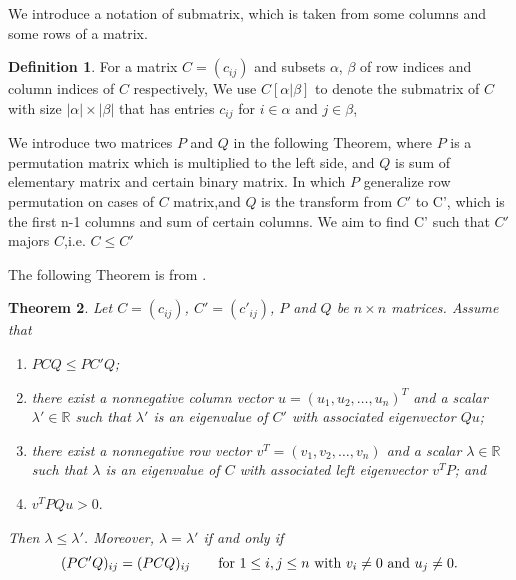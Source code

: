 \documentclass{article}
\theoremstyle{plain}
\newtheorem{thm}{Theorem}[section]
\theoremstyle{definition}
\newtheorem{defn}[thm]{Definition}
\begin{document}
    We introduce a notation of submatrix, which is taken from some columns and some rows of a
     matrix.

\begin{defn}
    For a matrix $C=(c_{ij})$ and subsets $\alpha$, $\beta$ of row indices and column 
    indices of $C$ respectively,  We use $C[\alpha|\beta]$ to denote the 
    submatrix of $C$ with size $ |\alpha| \times |\beta| $ that has entries $c_{ij}$ for $i\in \alpha$
    and $j\in\beta$,
\end{defn}


We introduce two matrices $P$ and $Q$ in the following Theorem, where $P$ is a permutation
 matrix which is multiplied to the left side, and $Q$ is sum of elementary matrix and
 certain binary matrix. In which $P$ generalize row permutation on cases of $C$
 matrix,and $Q$ is the transform from $C'$ to C', which is the first n-1 columns
  and sum of certain columns. We aim to find C' such that $C'$ majors $C$,i.e. $C\leq C'$
 
The following Theorem is from \cite{chang}.

\begin{thm}\label{pre_thm}
    Let $C=(c_{ij})$, $C'=(c'_{ij})$, $P$ and $Q$ be  $n\times n$ matrices.
Assume that
\begin{enumerate}[label=(\roman*)]
    \item \label{pre_thm_em1}  $PCQ\leq PC'Q$;
    \item \label{pre_thm_em2} there exist a nonnegative column vector $u=(u_1, u_2, \ldots, u_n)^T$  and a
    scalar $\lambda'\in \mathbb{R}$ such that $\lambda'$ is an eigenvalue of $C'$ with
    associated eigenvector $Qu$;
    \item \label{pre_thm_em3}  there exist a nonnegative row vector $v^T=(v_1, v_2, \ldots, v_n)$  and a scalar
    $\lambda\in \mathbb{R}$such that $\lambda$ is an eigenvalue of $C$ with associated  left
    eigenvector $v^TP$; and
    \item \label{pre_thm_em4} $v^TPQu>0.$
\end{enumerate}
    Then $\lambda\leq \lambda'$. Moreover, $\lambda=\lambda'$ if and only if
    \begin{equation}\label{pre0}
        (PC'Q)_{ij}=(PCQ)_{ij}\qquad \hbox{for~}1\leq i, j\leq n \hbox{~with~} v_i\ne 0 \hbox{~and~} u_j\ne 0.
    \end{equation}
\end{thm}
\end{document}
